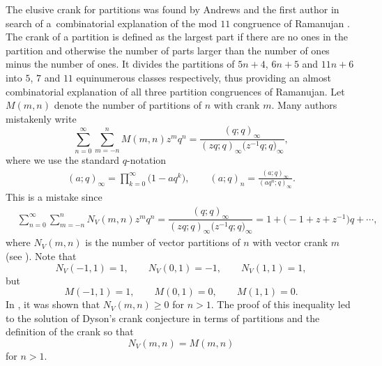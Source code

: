 \documentclass[pdftex]{sigma}
\numberwithin{equation}{section}
\newcommand\mylabel[1]{\label{#1}}
\begin{document}
The elusive crank for partitions was found by Andrews and the first author in search of a~combinatorial explanation of the mod $11$ congruence of Ramanujan \cite{An-Ga88}. The crank of a partition is defined as the largest part if there are no ones in the partition and otherwise the number of parts larger than the number of ones minus the number of ones. It divides the partitions of $5n+4$, $6n+5$ and $11n+6$ into $5$, $7$ and $11$ equinumerous classes respectively, thus providing an almost combinatorial explanation of all three partition congruences of Ramanujan. Let $M(m,n)$ denote the number of partitions of $n$ with crank $m$. Many authors mistakenly write
\begin{equation*}%
\sum_{n=0}^\infty \sum_{m=-n}^n
M(m,n) z^m q^n =
\dfrac{(q;q)_{\infty}}{(zq;q)_{\infty}\bigl(z^{-1}q;q\bigr)_{\infty}},
\end{equation*}%
where we use the standard $q$-notation
\begin{align*}
(a;q)_{\infty}= \prod_{k=0}^\infty \bigl(1-aq^k\bigr),
\qquad
(a;q)_{n}= \frac{(a;q)_{\infty}}{(aq^n;q)_{\infty}}.
\end{align*}
This is a mistake since
\begin{align*}
&{}\sum_{n=0}^\infty
\sum_{m=-n}^n N_V(m,n)z^mq^n=
\dfrac{(q;q)_{\infty}}{(zq;q)_{\infty}\bigl(z^{-1}q;q\bigr)_{\infty}}
=1+\bigl(-1+z+z^{-1}\bigr)q+\cdots,
\end{align*}
where $N_V(m, n)$ is the number of vector partitions of $n$ with vector
crank $m$ (see \cite{An-Ga88,Ga86,Ga88}).
Note that
\begin{equation*}%
N_V(-1,1)=1,\qquad N_V(0,1)=-1,\qquad N_V(1,1)=1,
\end{equation*}%
but
\begin{equation*}%
M(-1,1)=1,\qquad M(0,1)=0,\qquad M(1,1)=0.
\end{equation*}%
In \cite{Ga88b}, it was shown that $N_V(m,n)\geq 0$ for $n>1$. The proof of this inequality led to the solution of Dyson's crank conjecture in terms of partitions and the definition of the crank \cite{An-Ga88} so that
\begin{equation*}%
N_V(m,n)=M(m,n)
\end{equation*}%
for $n>1$.
\end{document}
